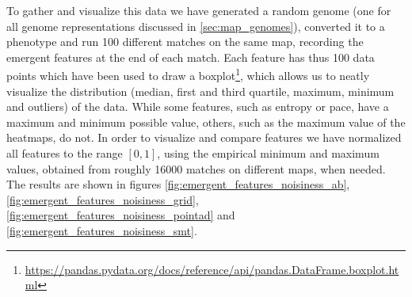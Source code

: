 To gather and visualize this data we have generated a random genome (one for all genome representations discussed in \cref{sec:map_genomes}), converted it to a phenotype and run 100 different matches on the same map, recording the emergent features at the end of each match. Each feature has thus 100 data points which have been used to draw a boxplot\footnote{\url{https://pandas.pydata.org/docs/reference/api/pandas.DataFrame.boxplot.html}}, which allows us to neatly visualize the distribution (median, first and third quartile, maximum, minimum and outliers) of the data. While some features, such as entropy or pace, have a maximum and minimum possible value, others, such as the maximum value of the heatmaps, do not. In order to visualize and compare features we have normalized all features to the range $[0, 1]$, using the empirical minimum and maximum values, obtained from roughly 16000 matches on different maps, when needed. The results are shown in figures \cref{fig:emergent_features_noisiness_ab}, \cref{fig:emergent_features_noisiness_grid}, \cref{fig:emergent_features_noisiness_pointad} and \cref{fig:emergent_features_noisiness_smt}.

